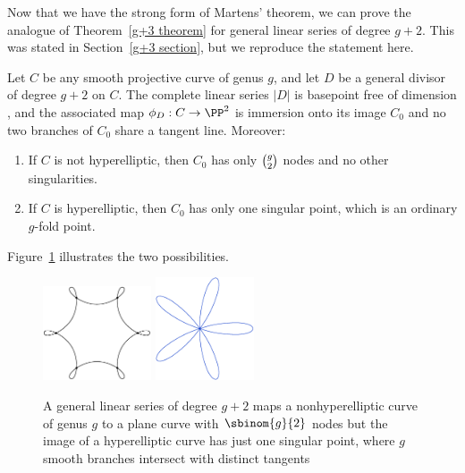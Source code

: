 Now that we have the strong form of Martens' theorem, we can prove the
analogue of Theorem~\ref{g+3 theorem} for general linear series of degree
$g+2$. This was stated in Section~\ref{g+3 section}, but 
we
reproduce
the statement here.
%

\begin{theorem}\label{needed for nodes}
Let $C$ be any smooth projective curve of genus $g$, and let $D$ be a
general divisor of degree $g+2$ on $C$.
The complete linear series $|D|$ is basepoint free of dimension \2,
and the associated map $\phi_D: C\to \PP^2$
 is 
 immersion
% 
onto its image $C_0$ 
and no two branches of $C_0$ share a tangent line. 
Moreover:

\begin{enumerate}
\item If $C$ is not hyperelliptic, then $C_0$ has only $\tbinom{g}{2}$
nodes and no other singularities. 
\item If $C$ is hyperelliptic,  
then
$C_0$ has only one singular point,
  which is an ordinary $g$-fold point.
\end{enumerate}
\end{theorem}

Figure~\ref{Fig9.4} illustrates the two possibilities.

\begin{figure}
\leavevmode{}\hbox{\includegraphics[height=1.1in]{main/Fig09-4A}}
\qquad
\includegraphics[height=1.2in]{main/five}
\caption{A general linear series of degree $g+2$ maps a nonhyperelliptic
curve of genus $g$
to a plane curve with $\protect\sbinom{g}{2}$ nodes 
but the image of a
hyperelliptic curve has
just one singular point, where $g$ smooth branches intersect with
distinct tangents
}
\label{Fig9.4}
\end{figure}

